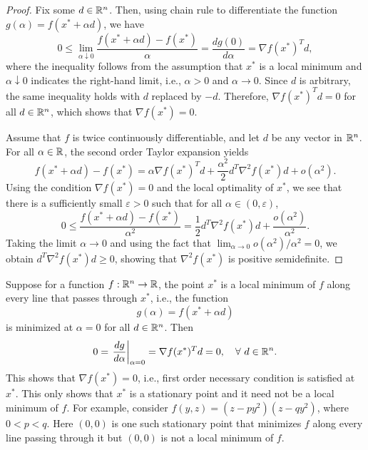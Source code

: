 \documentclass[11pt,a4paper]{article}
\begin{document}
\begin{proof}
    Fix some $d\in \mathbb{R}^n$. Then, using chain rule to differentiate the function $g(\alpha) = f(x^*+\alpha d)$, we have
    \begin{equation*}
        0\le \lim_{\alpha\downarrow 0} \dfrac{f(x^*+\alpha d) - f(x^*)}{\alpha} = \dfrac{dg(0)}{d\alpha} = \nabla f(x^*)^Td,
    \end{equation*}
    where the inequality follows from the assumption that $x^*$ is a local minimum and $\alpha\downarrow 0$ indicates the right-hand limit, i.e., $\alpha>0$ and $\alpha\rightarrow 0$. Since $d$ is arbitrary, the same inequality holds with $d$ replaced by $-d$. Therefore, $\nabla f(x^*)^Td = 0$ for all $d\in\mathbb{R}^n$, which shows that $\nabla f(x^*) = 0$.

    Assume that $f$ is twice continuously differentiable, and let $d$ be any vector in $\mathbb{R}^n$. For all $\alpha\in \mathbb{R}$, the second order Taylor expansion yields
    \begin{equation*}
        f(x^*+\alpha d) - f(x^*) = \alpha \nabla f(x^*)^T d + \frac{\alpha^2}{2} d^T\nabla^2 f(x^*) d + o(\alpha^2).
    \end{equation*}
    Using the condition $\nabla f(x^*) = 0$ and the local optimality of $x^*$, we see that there is a sufficiently small $\varepsilon>0$ such that for all $\alpha\in (0,\varepsilon)$,
    \begin{equation*}
        0\le\dfrac{f(x^*+\alpha d) - f(x^*)}{\alpha^2} = \frac{1}{2}d^T\nabla^2 f(x^*)d + \frac{o(\alpha^2)}{\alpha^2}.
    \end{equation*}
    Taking the limit $\alpha\rightarrow 0$ and using the fact that $\lim_{\alpha\rightarrow 0} o(\alpha^2)/\alpha^2 = 0$, we obtain $d^T\nabla^2 f(x^*)d\ge 0$, showing that $\nabla^2 f(x^*)$ is positive semidefinite.
\end{proof}

\begin{remark}
    Suppose for a function $f:\mathbb{R}^n\rightarrow \mathbb{R}$, the point $x^*$ is a local minimum of $f$ along every line that passes through $x^*$, i.e., the function 
    \begin{equation*}
        g(\alpha) = f(x^*+\alpha d)
    \end{equation*}
    is minimized at $\alpha = 0$ for all $d\in \mathbb{R}^n$. Then 
    \begin{equation*}
        0 = \left.\dfrac{dg}{d\alpha}\right|_{\alpha = 0} = \nabla f(x^*)^T d = 0,\quad \forall\ d\in \mathbb{R}^n.
    \end{equation*}
    This shows that $\nabla f(x^*) = 0$, i.e., first order necessary condition is satisfied at $x^*$. This only shows that $x^*$ is a stationary point and it need not be a local minimum of $f$. For example, consider $f(y,z) = (z-py^2)(z-qy^2)$, where $0<p<q$. Here $(0,0)$ is one such stationary point that minimizes $f$ along every line passing through it but $(0,0)$ is not a local minimum of $f$.
\end{remark}
\end{document}
